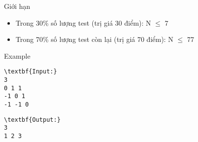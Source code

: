 Giới hạn
\begin{itemize}
	\item Trong 30\% số lượng test (trị giá 30 điểm): N  $\le$  7
	\item Trong 70\% số lượng test còn lại (trị giá 70 điểm): N  $\le$  77
\end{itemize}
Example
\begin{verbatim}
\textbf{Input:}
3
0 1 1
-1 0 1
-1 -1 0\end{verbatim}
\begin{verbatim}
\textbf{Output:}
3
1 2 3\end{verbatim}